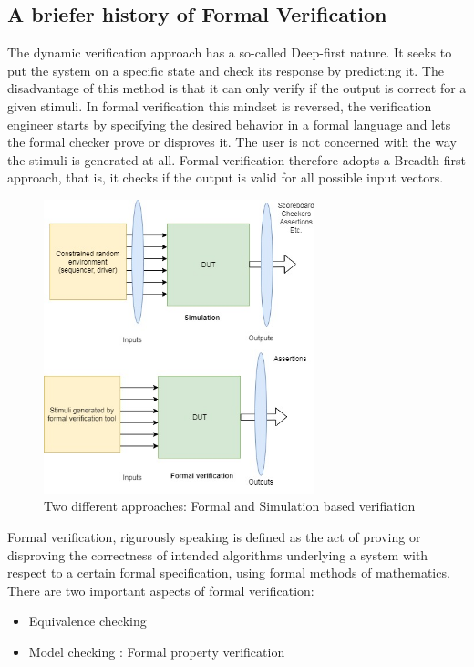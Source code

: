 \documentclass[a4paper,11pt]{article}
\begin{document}
\subsection{A briefer history of Formal Verification}
The dynamic verification approach has a so-called Deep-first nature. It seeks to put the system on a specific state and check its response by predicting it. The disadvantage of this method is that it can only verify if the output is correct for a given stimuli. In formal verification this mindset is reversed, the verification engineer starts by specifying the desired behavior in a formal language and lets the formal checker prove or disproves it. The user is not concerned with the way the stimuli is generated at all. Formal verification therefore adopts a Breadth-first approach, that is, it checks if the output is valid for all possible input vectors. 
\begin{figure}[h]
\centering
\includegraphics[width=0.7\textwidth]{formal_diagram.jpg}
\caption{Two different approaches: Formal and Simulation based verifiation}
\end{figure} 
Formal verification, rigurously speaking is defined as the act of proving or disproving the correctness of intended algorithms underlying a system with respect to a certain formal specification, using formal methods of mathematics\cite{whatisformal:EE}. There are two important aspects of formal verification:
\begin{itemize}
\item Equivalence checking
\item Model checking : Formal property verification
\end{itemize}
\end{document}
